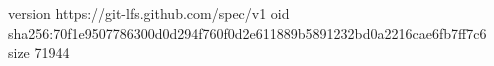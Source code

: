 version https://git-lfs.github.com/spec/v1
oid sha256:70f1e9507786300d0d294f760f0d2e611889b5891232bd0a2216cae6fb7ff7c6
size 71944
